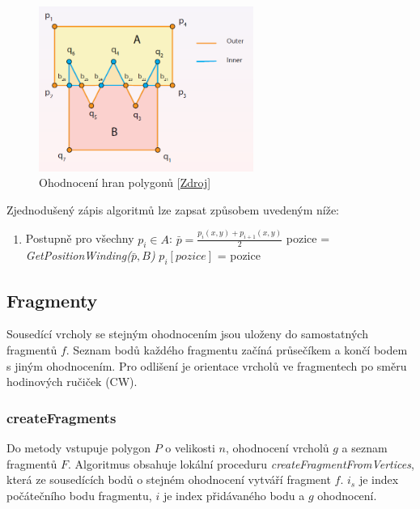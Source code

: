 \documentclass[a4paper, 12pt]{article}
\begin{document}
\begin{figure}[h!]
	\centering
	\includegraphics[width=7cm]{./pictures/doc_evaluation.png}
	\caption{Ohodnocení hran polygonů [\href{https://web.natur.cuni.cz/~bayertom/images/courses/Adk/adk9.pdf}{Zdroj}]}
\end{figure}

Zjednodušený zápis algoritmů lze zapsat způsobem uvedeným níže:
\begin{enumerate}
\item [] Postupně pro všechny $p_i \in A$:
\subitem $\bar{p} = \frac{p_i(x,y)+p_{i+1}(x,y)}{2}$
\subitem pozice = \textit{GetPositionWinding($\bar{p},B$)}
\subitem $p_i[pozice]$ = pozice
\end{enumerate}

\subsection{Fragmenty}
Sousedící vrcholy se stejným ohodnocením jsou uloženy do samostatných fragmentů $f$. Seznam bodů každého fragmentu začíná průsečíkem a končí bodem s jiným ohodnocením. Pro odlišení je orientace vrcholů ve fragmentech po směru hodinových ručiček (CW). 

\subsubsection{createFragments}
Do metody vstupuje polygon $P$ o velikosti $n$, ohodnocení vrcholů $g$ a seznam fragmentů $F$. Algoritmus obsahuje lokální proceduru \textit{createFragmentFromVertices}, která ze sousedících bodů o stejném ohodnocení vytváří fragment $f$. $i_s$ je index počátečního bodu fragmentu, $i$ je index přidávaného bodu a $g$ ohodnocení.\\
\end{document}
